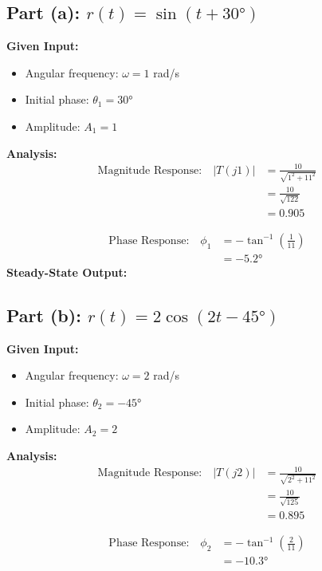 \documentclass{article}
\begin{document}
\subsection*{Part (a): $r(t) = \sin(t + 30°)$}
\textbf{Given Input:}
\begin{itemize}
    \item Angular frequency: $\omega = 1$ rad/s
    \item Initial phase: $\theta_1 = 30°$
    \item Amplitude: $A_1 = 1$
\end{itemize}

\textbf{Analysis:}
\begin{align*}
\text{Magnitude Response:} \quad |T(j1)| &= \frac{10}{\sqrt{1^2 + 11^2}} \\
&= \frac{10}{\sqrt{122}} \\
&= 0.905
\end{align*}

\begin{align*}
\text{Phase Response:} \quad \phi_1 &= -\tan^{-1}\left(\frac{1}{11}\right) \\
&= -5.2°
\end{align*}
{\color{solutionblue}
\textbf{Steady-State Output:}
}

\subsection*{Part (b): $r(t) = 2\cos(2t - 45°)$}
\textbf{Given Input:}
\begin{itemize}
    \item Angular frequency: $\omega = 2$ rad/s
    \item Initial phase: $\theta_2 = -45°$
    \item Amplitude: $A_2 = 2$
\end{itemize}

\textbf{Analysis:}
\begin{align*}
\text{Magnitude Response:} \quad |T(j2)| &= \frac{10}{\sqrt{2^2 + 11^2}} \\
&= \frac{10}{\sqrt{125}} \\
&= 0.895
\end{align*}

\begin{align*}
\text{Phase Response:} \quad \phi_2 &= -\tan^{-1}\left(\frac{2}{11}\right) \\
&= -10.3°
\end{align*}
\end{document}
